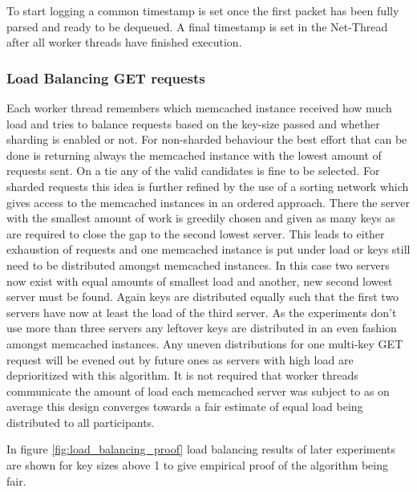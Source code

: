         To start logging a common timestamp is set once the first packet has been fully parsed and ready to be dequeued.
        A final timestamp is set in the Net-Thread after all worker threads have finished execution.

    \subsubsection{Load Balancing GET requests}
        Each worker thread remembers which memcached instance received how much load and tries to balance requests based
        on the key-size passed and whether sharding is enabled or not.  For non-sharded behaviour the best effort that
        can be done is returning always the memcached instance with the lowest amount of requests sent. On a tie any of
        the valid candidates is fine to be selected. For sharded requests this idea is further refined by the use of a
        sorting network which gives access to the memcached instances in an ordered approach. There the server with the
        smallest amount of work is greedily chosen and given as many keys as are required to close the gap to the second
        lowest server. This leads to either exhaustion of requests and one memcached instance is put under load or keys
        still need to be distributed amongst memcached instances. In this case two servers now exist with equal amounts
        of smallest load and another, new second lowest server must be found. Again keys are distributed equally such
        that the first two servers have now at least the load of the third server. As the experiments don't use more
        than three servers any leftover keys are distributed in an even fashion amongst memcached instances. Any uneven
        distributions for one multi-key GET request will be evened out by future ones as servers with high load are
        deprioritized with this algorithm. It is not required that worker threads communicate the amount of load each
        memcached server was subject to as on average this design converges towards a fair estimate of equal load being
        distributed to all participants.

        In figure \ref{fig:load_balancing_proof} load balancing results of later experiments are shown for key sizes
        above 1 to give empirical proof of the algorithm being fair.

